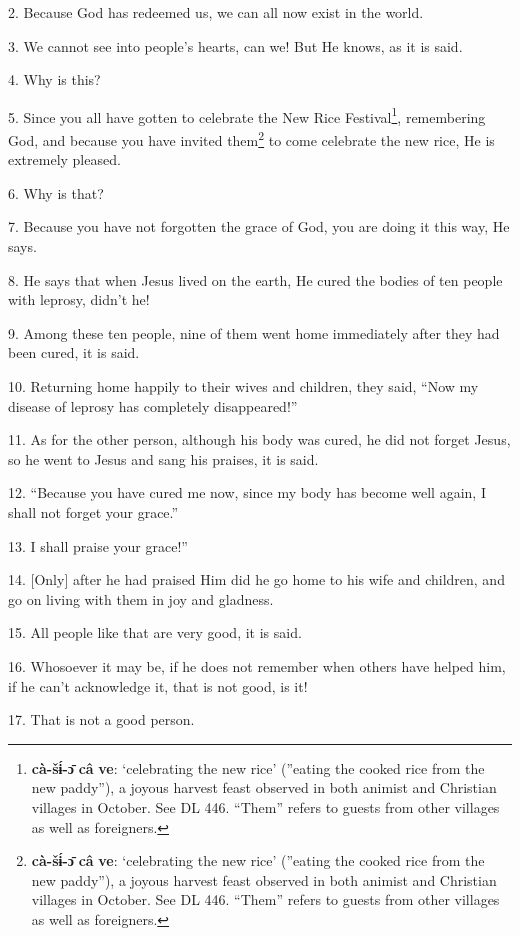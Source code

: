 2. Because God has redeemed us, we can all now exist in the world.

3. We cannot see into people's hearts, can we! But He knows, as it is said.

4. Why is this?

5. Since you all have gotten to celebrate the New Rice Festival\footnote{\textbf{cà-šɨ́-ɔ̄} \textbf{câ} \textbf{ve}: `celebrating the new rice' (''eating the cooked rice from the new paddy''), a joyous harvest feast observed in both animist and Christian villages in October. See DL 446. ``Them'' refers to guests from other villages as well as foreigners.}, remembering
God, and because you have invited them\footnote{\textbf{cà-šɨ́-ɔ̄} \textbf{câ} \textbf{ve}: `celebrating the new rice' (''eating the cooked rice from the new paddy''), a joyous harvest feast observed in both animist and Christian villages in October. See DL 446. ``Them'' refers to guests from other villages as well as foreigners.} to come celebrate the new rice, He is
extremely pleased.

6. Why is that?

7. Because you have not forgotten the grace of God, you are doing it this way,
He says.

8. He says that when Jesus lived on the earth, He cured the bodies of ten people
with leprosy, didn't he!

9. Among these ten people, nine of them went home immediately after they had been
cured, it is said.

10. Returning home happily to their wives and children, they said, ``Now my disease
of leprosy has completely disappeared!''

11. As for the other person, although his body was cured, he did not forget Jesus,
so he went to Jesus and sang his praises, it is said.

12. ``Because you have cured me now, since my body has become well again, I shall
not forget your grace.''

13. I shall praise your grace!''

14. [Only] after he had praised Him did he go home to his wife and children, and
go on living with them in joy and gladness.

15. All people like that are very good, it is said.

16. Whosoever it may be, if he does not remember when others have helped him, if
he can't acknowledge it, that is not good, is it!

17. That is not a good person.


